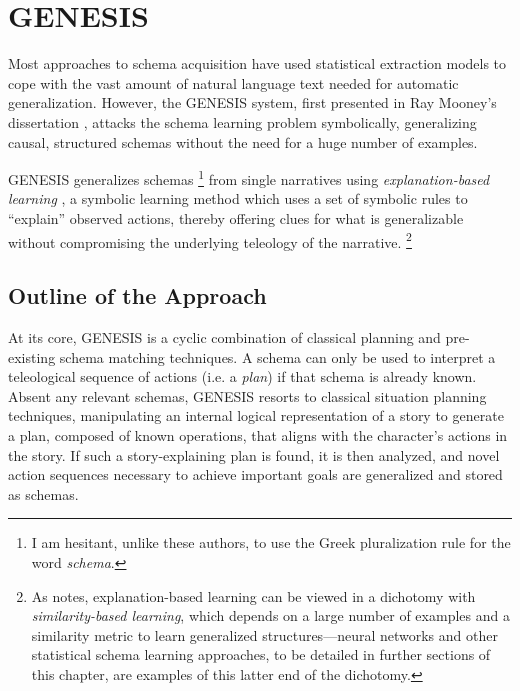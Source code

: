 \section{GENESIS}
\label{sec:genesis}

Most approaches to schema acquisition have used statistical extraction models to cope with the vast amount of natural language text needed for automatic generalization. However, the GENESIS system, first presented in Ray Mooney's dissertation \citep{mooney:phd88}, attacks the schema learning problem symbolically, generalizing causal, structured schemas  without the need for a huge number of examples.

GENESIS generalizes schemas \footnote{I am hesitant, unlike these authors, to use the Greek pluralization rule for the word \textit{schema}.} from single narratives using \textit{explanation-based learning} \citep{mitchell1986}, a symbolic learning method which uses a set of symbolic rules to ``explain'' observed actions, thereby offering clues for what is generalizable without compromising the underlying teleology of the narrative. \footnote{As \citep{mooney90} notes, explanation-based learning can be viewed in a dichotomy with \textit{similarity-based learning}, which depends on a large number of examples and a similarity metric to learn generalized structures---neural networks and other statistical schema learning approaches, to be detailed in further sections of this chapter, are examples of this latter end of the dichotomy.}

\subsection{Outline of the Approach}
\label{sec:genesisapproach}

At its core, GENESIS is a cyclic combination of classical planning and pre-existing schema matching techniques. A schema can only be used to interpret a teleological sequence of actions (i.e. a \textit{plan}) if that schema is already known. Absent any relevant schemas, GENESIS resorts to classical situation planning techniques, manipulating an internal logical representation of a story to generate a plan, composed of known operations, that aligns with the character's actions in the story. If such a story-explaining plan is found, it is then analyzed, and novel action sequences necessary to achieve important goals are generalized and stored as schemas.

